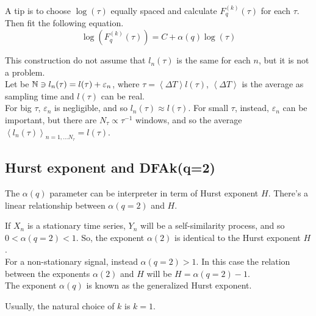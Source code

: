 A tip is to choose $\log(\tau)$ equally spaced and calculate $F_q^{( k )}(\tau )$ for each $\tau$. Then fit the following equation.
\begin{equation}
	\log(F_q^{( k )}(\tau )) = C + \alpha(q) \log(\tau)
\end{equation}

This construction do not assume that $l_n(\tau)$ is the same for each $n$, but it is not a problem. \\
Let be $\mathbb{N} \ni l_n(\tau) = l(\tau) + \varepsilon_n$, where $\tau = \left< \Delta T\right> l(\tau)$, $\left< \Delta T\right>$ is the average as sampling time and $l(\tau)$ can be real. \\
For big $\tau$, $\varepsilon_n$ is negligible, and so $l_n(\tau) \approx l(\tau)$. For small $\tau$, instead, $\varepsilon_n$ can be important, but there are $N_{\tau} \propto \tau^{-1}$ windows, and so the average $\left< l_n(\tau) \right>_{n = 1, \dots N_{\tau}} = l(\tau)$.

\subsection{Hurst exponent and DFAk(q=2)}
The $\alpha(q)$ parameter can be interpreter in term of Hurst exponent $H$. There's a linear relationship between $\alpha(q=2)$ and $H$.

If $X_n$ is a stationary time series, $Y_n$ will be a self-similarity process, and so $0 < \alpha(q = 2) < 1$. So, the exponent $\alpha(2)$ is identical to the Hurst exponent $H$.\\ %
For a non-stationary signal, instead $\alpha(q = 2) > 1$. In this case the relation between the exponents $\alpha(2)$ and $H$ will be
$H = \alpha(q = 2)-1$. \\
The exponent $\alpha(q)$ is known as the generalized Hurst exponent.

Usually, the natural choice of $k$ is $k=1$.
